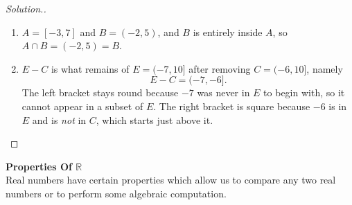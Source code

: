 \documentclass[11pt,a4paper]{article}
\theoremstyle{definition}
\newenvironment{solution}
  {\renewcommand{\qedsymbol}{}\begin{proof}[\textit{Solution}.]}
  {\end{proof}}
\begin{document}
\begin{solution}

\begin{enumerate}
\item $A=[-3,7]$ and $B=(-2,5)$, and $B$ is entirely inside $A$, so
$A\cap B=(-2,5)=B$.
\item $E-C$ is what remains of $E=(-7,10]$ after removing $C=(-6,10]$, namely
$$E-C=(-7,-6].$$
The left bracket stays round because $-7$ was never in $E$ to begin with, so it
cannot appear in a subset of $E$. The right bracket is square because $-6$ is in
$E$ and is \emph{not} in $C$, which starts just above it.
\end{enumerate}
\end{solution}
\pagebreak
\textbf{Properties Of $\mathbb{R}$}\\
Real numbers have certain properties which allow us to compare any two real numbers or to perform some algebraic computation.
\end{document}
